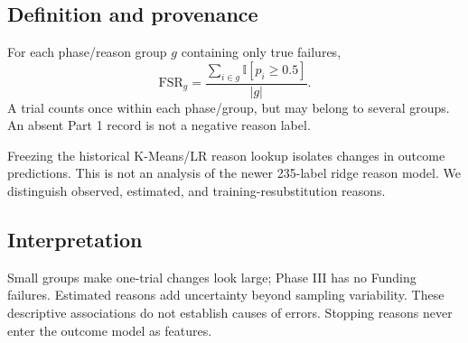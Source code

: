 \subsection{Definition and provenance}
For each phase/reason group $g$ containing only true failures,
\begin{equation}
 \mathrm{FSR}_{g}=\frac{\sum_{i\in g}\mathbb{I}[p_i\geq0.5]}{|g|}.
\end{equation}
A trial counts once within each phase/group, but may belong to several groups.
An absent Part 1 record is not a negative reason label.

Freezing the historical K-Means/LR reason lookup isolates changes in outcome predictions.
This is not an analysis of the newer 235-label ridge reason model. We distinguish observed,
estimated, and training-resubstitution reasons.



\subsection{Interpretation}


Small groups make one-trial changes look large; Phase III has no Funding failures.
Estimated reasons add uncertainty beyond sampling variability. These descriptive associations
do not establish causes of errors. Stopping reasons never enter the outcome model as features.

